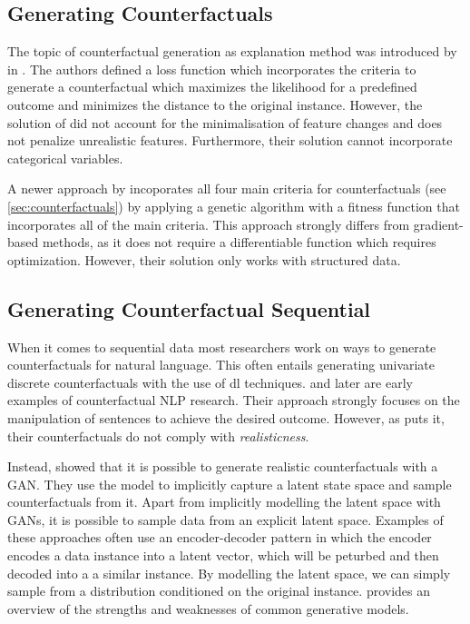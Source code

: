 \documentclass[./../../paper.tex]{subfiles}
\begin{document}
\subsection{Generating Counterfactuals}
The topic of counterfactual generation as explanation method was introduced by \citeauthor{wachter_CounterfactualExplanationsOpening_2017} in \citeyear{wachter_CounterfactualExplanationsOpening_2017}\needscite{}. The authors defined a loss function which incorporates the criteria to generate a counterfactual which maximizes the likelihood for a predefined outcome and minimizes the distance to the original instance. However, the solution of \citeauthor{wachter_CounterfactualExplanationsOpening_2017} did not account for the minimalisation of feature changes and does not penalize unrealistic features. Furthermore, their solution cannot incorporate categorical variables.

A newer approach by \citeauthor{dandl_MultiObjectiveCounterfactualExplanations_2020} incoporates all four main criteria for counterfactuals (see \autoref{sec:counterfactuals}) by applying a genetic algorithm with a fitness function that incorporates all of the main criteria\needscite{}. This approach strongly differs from gradient-based methods, as it does not require a differentiable function which requires optimization. However, their solution only works with structured data.

\subsection{Generating Counterfactual Sequential}
When it comes to sequential data most researchers work on ways to generate counterfactuals for natural language. This often entails generating univariate discrete counterfactuals with the use of \gls{dl} techniques. \citeauthor{martens_ExplainingDatadrivenDocument_2014} and later \citeauthor{krause_InteractingPredictionsVisual_2016} are early examples of counterfactual NLP research. Their approach strongly focuses on the manipulation of sentences to achieve the desired outcome. However, as \citeauthor{robeer_GeneratingRealisticNatural_2021} puts it, their counterfactuals do not comply with \emph{realisticness}.

Instead, \citeauthor{robeer_GeneratingRealisticNatural_2021} showed that it is possible to generate realistic counterfactuals with a \gls{GAN}. They use the model to implicitly capture a latent state space and sample counterfactuals from it. Apart from implicitly modelling the latent space with \glspl{GAN}, it is possible to sample data from an explicit latent space. Examples of these approaches often use an encoder-decoder pattern in which the encoder encodes a data instance into a latent vector, which will be peturbed and then decoded into a a similar instance\autocite{melnyk_ImprovedNeuralText_2017}\autocite{wang_ControllableUnsupervisedText_2019}. By modelling the latent space, we can simply sample from a distribution conditioned on the original instance. \citeauthor{bond-taylor_DeepGenerativeModelling_2021} provides an overview of the strengths and weaknesses of common generative models.
\end{document}
